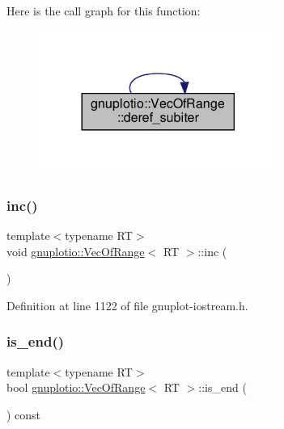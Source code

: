 Here is the call graph for this function\+:\nopagebreak
\begin{figure}[H]
\begin{center}
\leavevmode
\includegraphics[width=221pt]{classgnuplotio_1_1_vec_of_range_a9b02d8bd8ec62ba77de16ad8ea8a87b2_cgraph}
\end{center}
\end{figure}
\mbox{\label{classgnuplotio_1_1_vec_of_range_a2e5371ab6c88994e3fc6f12324783e1c}} 
\subsubsection{\texorpdfstring{inc()}{inc()}}
{\footnotesize\ttfamily template$<$typename RT$>$ \\
void \hyperlink{classgnuplotio_1_1_vec_of_range}{gnuplotio\+::\+Vec\+Of\+Range}$<$ RT $>$\+::inc (\begin{DoxyParamCaption}{ }\end{DoxyParamCaption})\hspace{0.3cm}{\ttfamily [inline]}}



Definition at line 1122 of file gnuplot-\/iostream.\+h.

\mbox{\label{classgnuplotio_1_1_vec_of_range_a714b945004e06909e5a0cdc3cca619b5}} 
\subsubsection{\texorpdfstring{is\+\_\+end()}{is\_end()}}
{\footnotesize\ttfamily template$<$typename RT$>$ \\
bool \hyperlink{classgnuplotio_1_1_vec_of_range}{gnuplotio\+::\+Vec\+Of\+Range}$<$ RT $>$\+::is\+\_\+end (\begin{DoxyParamCaption}{ }\end{DoxyParamCaption}) const\hspace{0.3cm}{\ttfamily [inline]}}




